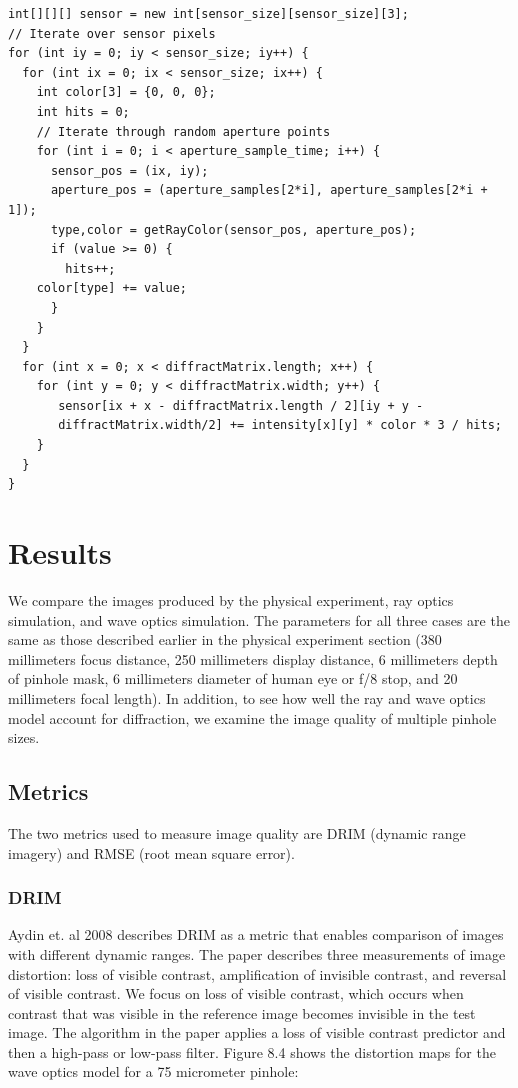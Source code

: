 \begin{lstlisting}[frame=single, basicstyle=\footnotesize\ttfamily, caption=Pseudocode For Wave Optics Simulation]
int[][][] sensor = new int[sensor_size][sensor_size][3];
// Iterate over sensor pixels
for (int iy = 0; iy < sensor_size; iy++) {
  for (int ix = 0; ix < sensor_size; ix++) {
    int color[3] = {0, 0, 0};
    int hits = 0;
    // Iterate through random aperture points
    for (int i = 0; i < aperture_sample_time; i++) {
      sensor_pos = (ix, iy);
      aperture_pos = (aperture_samples[2*i], aperture_samples[2*i + 1]);
      type,color = getRayColor(sensor_pos, aperture_pos);
      if (value >= 0) {
        hits++;
	color[type] += value;
      }
    }
  }
  for (int x = 0; x < diffractMatrix.length; x++) {
    for (int y = 0; y < diffractMatrix.width; y++) {
       sensor[ix + x - diffractMatrix.length / 2][iy + y - 
       diffractMatrix.width/2] += intensity[x][y] * color * 3 / hits;
    }
  }
}
\end{lstlisting}

\section{Results}

We compare the images produced by the physical experiment, ray optics simulation, and wave optics simulation. The parameters for all three cases are the same as those described earlier in the physical experiment section (380 millimeters focus distance, 250 millimeters display distance, 6 millimeters depth of pinhole mask, 6 millimeters diameter of human eye or f/8 stop, and 20 millimeters focal length). In addition, to see how well the ray and wave optics model account for diffraction, we examine the image quality of multiple pinhole sizes.

\subsection{Metrics}

The two metrics used to measure image quality are DRIM (dynamic range imagery) and RMSE (root mean square error).

\subsubsection{DRIM}

Aydin et. al 2008 \cite{aydin2008dynamic} describes DRIM as a metric that enables comparison of images with different dynamic ranges. The paper describes three measurements of image distortion: loss of visible contrast, amplification of invisible contrast, and reversal of visible contrast. We focus on loss of visible contrast, which occurs when contrast that was visible in the reference image becomes invisible in the test image. The algorithm in the paper applies a loss of visible contrast predictor and then a high-pass or low-pass filter. Figure 8.4 shows the distortion maps for the wave optics model for a 75 micrometer pinhole:

